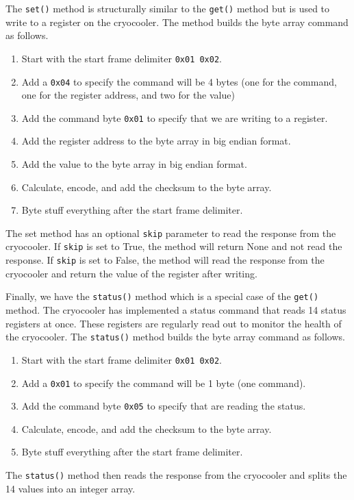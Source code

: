 The \texttt{set()} method is structurally similar to the \texttt{get()} method but is used to write to a register on the cryocooler.
The method builds the byte array command as follows.
\begin{enumerate}
    \item Start with the start frame delimiter \texttt{0x01 0x02}.
    \item Add a \texttt{0x04} to specify the command will be 4 bytes (one for the command, one for the register address, and two for the value)
    \item Add the command byte \texttt{0x01} to specify that we are writing to a register.
    \item Add the register address to the byte array in big endian format.
    \item Add the value to the byte array in big endian format.
    \item Calculate, encode, and add the checksum to the byte array.
    \item Byte stuff everything after the start frame delimiter.
\end{enumerate}
The set method has an optional \texttt{skip} parameter to read the response from the cryocooler.
If \texttt{skip} is set to True, the method will return None and not read the response.
If \texttt{skip} is set to False, the method will read the response from the cryocooler and return the value of the register after writing.

Finally, we have the \texttt{status()} method which is a special case of the \texttt{get()} method.
The cryocooler has implemented a status command that reads 14 status registers at once.
These registers are regularly read out to monitor the health of the cryocooler.
The \texttt{status()} method builds the byte array command as follows.
\begin{enumerate}
    \item Start with the start frame delimiter \texttt{0x01 0x02}.
    \item Add a \texttt{0x01} to specify the command will be 1 byte (one command).
    \item Add the command byte \texttt{0x05} to specify that are reading the status.
    \item Calculate, encode, and add the checksum to the byte array.
    \item Byte stuff everything after the start frame delimiter.
\end{enumerate}
The \texttt{status()} method then reads the response from the cryocooler and splits the 14 values into an integer array. 

